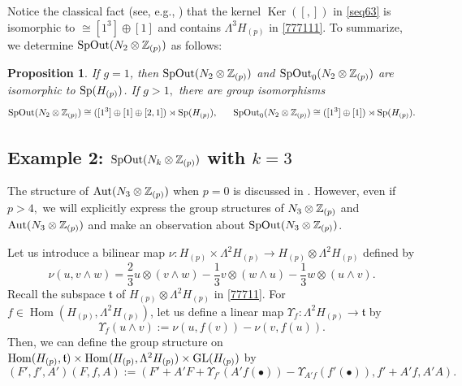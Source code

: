 \documentclass{article}
\theoremstyle{plain}
\newtheorem{prop}[thm]{Proposition}
\theoremstyle{definition}
\def\Qer{\mathop{\mathrm{Ker}}\nolimits}
\def\Hom{\mathop{\mathrm{Hom}}\nolimits}
\newcommand{\ra}{\rightarrow}
\newcommand{\Z}{{\Bbb Z}}
\newcommand{\Aut}{{\rm Aut}}
\newcommand{\Sp}{{\rm Sp}}
\newcommand{\GL}{{\rm GL}}
\newcommand{\SpOut}{{\rm SpOut}}
\begin{document}
{Notice the classical fact (see, e.g., \cite{DJ}) that the kernel $ \Qer([,])$ in \eqref{seq63} is isomorphic to $ \cong [1^3] \oplus [1] $ and contains $ \Lambda^3 H_{(p)} $ in \eqref{777111}. To summarize, we determine $\mathrm{SpOut}( N_2 \otimes \Z_{(p)}) $ as follows:
\begin{prop}\label{tuki}
If $g=1$, then $\mathrm{SpOut}( N_2 \otimes \Z_{(p)}) $ and $ \mathrm{SpOut}_0( N_2 \otimes \Z_{(p)})$ are isomorphic to $\Sp(H_{(p)})$. If $g>1,$ there are group isomorphisms
\[\mathrm{SpOut}( N_2 \otimes \Z_{(p)}) \cong ([1^3] \oplus [1]\oplus [2,1]) \rtimes \Sp(H_{(p)}), \ \ \ \ \ \mathrm{SpOut}_0( N_2 \otimes \Z_{(p)}) \cong ([1^3] \oplus [1]) \rtimes \Sp(H_{(p)}). \]
\end{prop}

\subsection{Example 2: $\SpOut( N_k \otimes \Z_{(p)})$ with $k=3$}
\label{9723}
The structure of $\Aut( N_3 \otimes \Z_{(p)})$ when $p=0$ is discussed in \cite{Mo4}. However, even if $p>4,$ we will explicitly express the group structures of $N_3 \otimes \Z_{(p)} $ and $\Aut( N_3 \otimes \Z_{(p)})$ and make an observation about $\SpOut( N_3 \otimes \Z_{(p)})$.

Let us introduce a bilinear map $\nu : H_{(p)}\times \Lambda^2 H_{(p)} \ra H_{(p)}\otimes \Lambda^2 H_{(p)}$ defined by
\begin{equation}\label{888}
\nu (u, v\wedge w) = \frac{2}{3} u\otimes ( v\wedge w) -\frac{1}{3}v\otimes ( w\wedge u) - \frac{1}{3}w\otimes ( u\wedge v).
\end{equation}
Recall the subspace $\mathfrak{t}$ of $H_{(p)} \otimes \Lambda^2 H_{(p)} $ in \eqref{77711}. For $f \in \Hom( H_{(p)}, \Lambda^2 H_{(p)} ) $, let us define a linear map $\Upsilon_{f} : \Lambda^2 H_{(p)} \ra \mathfrak{t} $ by
\begin{equation}\label{7771}
\Upsilon_{f}(u \wedge v):= \nu(u, f(v))- \nu(v, f(u ) ).
\end{equation}
Then, we can define the group structure on $\Hom( H_{(p)}, \mathfrak{t} ) \times \Hom( H_{(p)}, \Lambda^2 H_{(p)}) \times \GL(H_{(p)}) $ by
\begin{equation}\label{777}
(F',f', A') (F,f, A):= (F'+ A' F+ \Upsilon_{f'}(A'f( \bullet)) -\Upsilon_{A' f}(f' ( \bullet)) , f'+A'f, A'A).
\end{equation}

}
\end{document}
